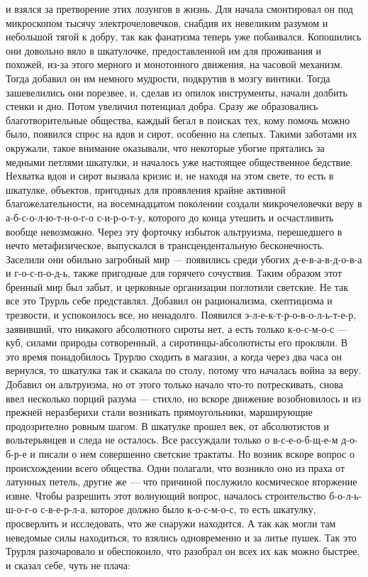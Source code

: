 и взялся за претворение этих лозунгов в жизнь. Для начала
смонтировал он под микроскопом тысячу электрочеловечков,
снабдив их невеликим разумом и небольшой тягой к добру, так
как фанатизма теперь уже побаивался. Копошились они довольно
вяло в шкатулочке, предоставленной им для проживания и
похожей, из-за этого мерного и монотонного движения, на
часовой механизм. Тогда добавил он им немного мудрости,
подкрутив в мозгу винтики. Тогда зашевелились они порезвее,
и, сделав из опилок инструменты, начали долбить стенки и
дно. Потом увеличил потенциал добра. Сразу же образовались
благотворительные общества, каждый бегал в поисках тех, кому
помочь можно было, появился спрос на вдов и сирот, особенно
на слепых. Такими заботами их окружали, такое внимание
оказывали, что некоторые убогие прятались за медными петлями
шкатулки, и началось уже настоящее общественное бедствие.
Нехватка вдов и сирот вызвала кризис и, не находя на этом
свете, то есть в шкатулке, объектов, пригодных для
проявления крайне активной благожелательности, на
восемнадцатом поколении создали микрочеловечки веру в
а-б-с-о-л-ю-т-н-о-г-о с-и-р-о-т-у, которого до конца утешить
и осчастливить вообще невозможно. Через эту форточку избыток
альтруизма, перешедшего в нечто метафизическое, выпускался в
трансцендентальную бесконечность. Заселили они обильно
загробный мир --- появились среди убогих д-е-в-а-в-д-о-в-а и
г-о-с-п-о-д-ь, также пригодные для горячего сочуствия. Таким
образом этот бренный мир был забыт, и церковные организации
поглотили светские. Не так все это Трурль себе представлял.
Добавил он рационализма, скептицизма и трезвости, и
успокоилось все, но ненадолго. Появился
э-л-е-к-т-р-о-в-о-л-ь-т-е-р, заявивший, что никакого
абсолютного сироты нет, а есть только к-о-с-м-о-с --- куб,
силами природы сотворенный, а сиротинцы-абсолютисты его
прокляли. В это время понадобилось Трурлю сходить в магазин,
а когда через два часа он вернулся, то шкатулка так и
скакала по столу, потому что началась война за веру. Добавил
он альтруизма, но от этого только начало что-то
потрескивать, снова ввел несколько порций разума --- стихло,
но вскоре движение возобновилось и из прежней неразберихи
стали возникать прямоугольники, марширующие продозрително
ровным шагом. В шкатулке прошел век, от абсолютистов и
вольтерьянцев и следа не осталось. Все рассуждали только о
в-с-е-о-б-щ-е-м д-о-б-р-е и писали о нем совершенно светские
трактаты. Но возник вскоре вопрос о происхождении всего
общества. Одни полагали, что возникло оно из праха от
латунных петель, другие же --- что причиной послужило
космическое вторжение извне. Чтобы разрешить этот волнующий
вопрос, началось строительство б-о-л-ь-ш-о-г-о с-в-е-р-л-а,
которое должно было к-о-с-м-о-с, то есть шкатулку,
просверлить и исследовать, что же снаружи находится. А так
как могли там неведомые силы находиться, то взялись
одновременно и за литье пушек. Так это Трурля разочаровало и
обеспокоило, что разобрал он всех их как можно быстрее, и
сказал себе, чуть не плача:


